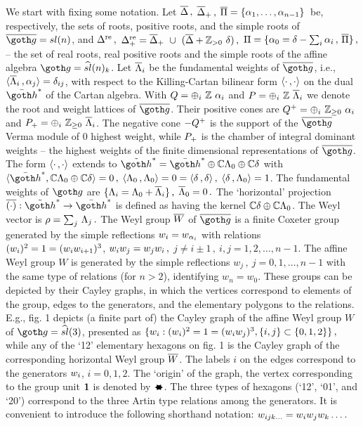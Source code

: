 %
%

We start with fixing some notation.  Let  $\overline\Delta\,,$ $\overline\Delta_+\,,$
$\overline\Pi=\{\alpha_1,\dots, \alpha_{n-1}\}\,$  be, respectively, the sets of
roots, positive roots, and the simple roots of  $\bgo=sl(n)$, and
$\Delta^{\rm re}\,,$ $\Delta^{\rm re}_+=\overline\Delta_+\ \cup\ (\overline\Delta+\Bbb Z_{>0}\ \delta)\,,$
$\Pi=\{\alpha_0=\delta- \sum_i\alpha_i\,,\, \overline\Pi\}\,,$ -- the set of
real roots, real positive roots and the simple roots  of the
affine algebra $\go=\widehat{sl}(n)_k$.  Let $\overline{\Lambda}_i$ be the
fundamental weights of $\bgo$, i.e.,
$\langle\overline{\Lambda}_i\,,\alpha_j\rangle=\delta_{ij}$, with respect to the
Killing-Cartan bilinear form $\langle\cdot\,,\cdot\rangle$ on the dual
$\bh^*$ of the Cartan algebra.  With $Q=\oplus_{i}\ \Bbb Z\ \alpha_i$
and $P=\oplus_{i}\ \Bbb Z\ \overline{\Lambda}_i$ we denote the root and weight
lattices of $\bgo$. Their positive cones are $Q^+=\oplus_{i}\
\Bbb Z_{\ge 0}\ \alpha_i$ and $\WL_+=\oplus_{i}\ \IZp\ \fw_i$.  The negative
cone $-Q^+$ is the support of the $\bgo$ Verma module of 0
highest weight, while $P_+$ is the chamber of integral dominant
weights -- the highest weights of the finite dimensional
representations of $\bgo$.  The form $\langle\cdot\,,\cdot\rangle$
extends to $\th^*=\bh^*\oplus\IC\FW_0\oplus \IC\zd$ with $\la
\bh^*, \IC\FW_0\oplus \IC\zd \ra=0\,,$ $\langle \Lambda_0\,,
\Lambda_0\rangle=0=\langle \delta\,,
\delta\rangle\,,$ $\langle\delta\,,\Lambda_0\rangle=1$.  The fundamental weights of
$\go$ are $\{\Lambda_i=\Lambda_0+\overline{\Lambda}_i\}\,,$ $\overline{\Lambda}_0=0\,.$ The
`horizontal' projection $\overline{(\cdot)}:\th^*\to\bh^*$ is
defined as having the kernel $\Bbb C\delta\oplus\Bbb C\Lambda_0$.  The Weyl
vector is $\rho=\sum_j\, \Lambda_j\,.$ The   Weyl group  $\overline W$ of
$\bgo$ is a finite Coxeter group generated by the simple
reflections $w_i=w_{\alpha_i}$ with relations
$(w_i)^2=1=(w_iw_{i+1})^3$, $w_iw_{j}=w_jw_{i}\,,$
$j\not= i\pm 1\,, \ i,j=1,2,\dots, n-1$. The affine Weyl group
$W$ is 
generated by the simple reflections $w_j\,, \ j=0,1,\dots, n-1$
with the same type of relations (for $n>2$), identifying
$w_n=w_0$.  These groups can be depicted by their Cayley graphs,
in which the vertices correspond to elements of the group, edges
to the generators, and the elementary polygons to the relations.
E.g., fig. 1 depicts (a finite part of) the  Cayley graph of the
affine Weyl group $W$ of $\go=\widehat{sl}(3)$, presented as $\{
w_i :  (w_i)^2=1=(w_iw_j)^3 , \{i,j\}\subset\{0,1,2\}
\}\,, $ while  any of the `12' elementary hexagons on fig. 1 is
the Cayley graph of the corresponding horizontal Weyl group
$\overline W$.  The labels $i$ on the edges correspond to the generators
$w_i$, $i=0,1,2$. The `origin' of the graph, the vertex
corresponding to the group unit ${\bf 1}$ is denoted by $\blacktriangleleft\kern-.6em\blacktriangleright$. The
three types of hexagons (`12', `01', and `20') correspond to the
three Artin type relations among the generators.  It is
convenient to introduce the following shorthand notation:
$w_{ijk\dots} = w_i w_j w_k \dots$.

